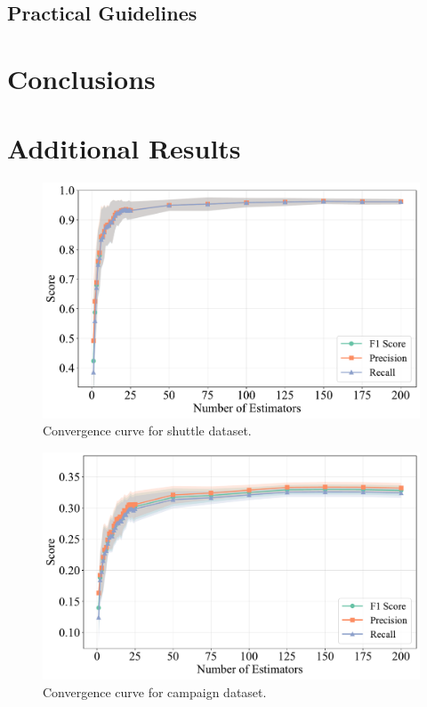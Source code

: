 \documentclass[10pt, conference]{IEEEtran}
\begin{document}


\subsection{Practical Guidelines}
\section{Conclusions}





\appendices
\section{Additional Results}
\begin{figure}[H]
	\centering
	\includegraphics[width=\linewidth]{../results/shuttle/n_estimators/convergence_curve.pdf}
	\caption{Convergence curve for shuttle dataset.}
	\label{fig:n_estimators_shuttle}
\end{figure}
\begin{figure}[H]
	\centering
	\includegraphics[width=\linewidth]{../results/campaign/n_estimators/convergence_curve.pdf}
	\caption{Convergence curve for campaign dataset.}
	\label{fig:n_estimators_campaign}
\end{figure}
\end{document}
